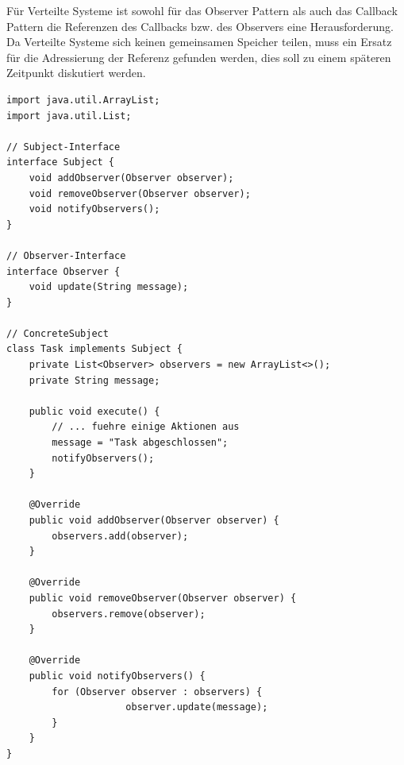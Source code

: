 \documentclass[../vs-script-first-v01.tex]{subfiles}
\begin{document}
Für Verteilte Systeme ist sowohl für das Observer Pattern als auch das Callback Pattern die Referenzen des Callbacks bzw. des Observers eine Herausforderung. Da Verteilte Systeme sich keinen gemeinsamen Speicher teilen, muss ein Ersatz für die Adressierung der Referenz gefunden werden, dies soll zu einem späteren Zeitpunkt diskutiert werden. \\
\newpage
\begin{minipage}{\textwidth}
\begin{lstlisting}[caption={Observer Pattern - ConcreteSubject},captionpos=b,label={lst:observer-I}]
import java.util.ArrayList;
import java.util.List;

// Subject-Interface
interface Subject {
    void addObserver(Observer observer);
    void removeObserver(Observer observer);
    void notifyObservers();
}

// Observer-Interface
interface Observer {
    void update(String message);
}

// ConcreteSubject
class Task implements Subject {
    private List<Observer> observers = new ArrayList<>();
    private String message;

    public void execute() {
        // ... fuehre einige Aktionen aus
        message = "Task abgeschlossen";
        notifyObservers();
    }

    @Override
    public void addObserver(Observer observer) {
        observers.add(observer);
    }

    @Override
    public void removeObserver(Observer observer) {
        observers.remove(observer);
    }

    @Override
    public void notifyObservers() {
        for (Observer observer : observers) {
                     observer.update(message);
        }
    }
}


\end{lstlisting}
\end{minipage}
\end{document}
